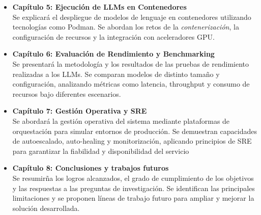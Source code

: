 \begin{itemize}
    \item \textbf{Capítulo 5: Ejecución de LLMs en Contenedores}\\
    Se explicará el despliegue de modelos de lenguaje en contenedores utilizando tecnologías como Podman. Se abordan los retos de la \textit{contenerización}, la configuración de recursos y la integración con aceleradores GPU.
    \item \textbf{Capítulo 6: Evaluación de Rendimiento y Benchmarking}\\
    Se presentará la metodología y los resultados de las pruebas de rendimiento realizadas a los LLMs. Se comparan modelos de distinto tamaño y configuración, analizando métricas como latencia, throughput y consumo de recursos bajo diferentes escenarios.
    \item \textbf{Capítulo 7: Gestión Operativa y SRE}\\
    Se abordará la gestión operativa del sistema mediante plataformas de orquestación para simular entornos de producción. Se demuestran capacidades de autoescalado, auto-healing y monitorización, aplicando principios de SRE para garantizar la fiabilidad y disponibilidad del servicio
    \item \textbf{Capítulo 8: Conclusiones y trabajos futuros}\\
    Se resumirña los logros alcanzados, el grado de cumplimiento de los objetivos y las respuestas a las preguntas de investigación. Se identifican las principales limitaciones y se proponen líneas de trabajo futuro para ampliar y mejorar la solución desarrollada.
\end{itemize}
